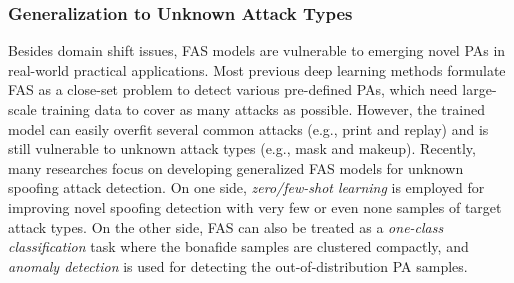 \documentclass[10pt,journal,compsoc]{IEEEtran}
\begin{document}







\subsubsection{Generalization to Unknown Attack Types}

Besides domain shift issues, FAS models are vulnerable to emerging novel PAs in real-world practical applications. Most previous deep learning methods formulate FAS as a close-set problem to detect various pre-defined PAs, which need large-scale training data to cover as many attacks as possible. However, the trained model can easily overfit several common attacks (e.g., print and replay) and is still vulnerable to unknown attack types (e.g., mask and makeup). Recently, many researches focus on developing generalized FAS models for unknown spoofing attack detection. On one side, \textit{zero/few-shot learning} is employed for improving novel spoofing detection with very few or even none samples of target attack types. On the other side, FAS can also be treated as a \textit{one-class classification} task where the bonafide samples are clustered compactly, and \textit{anomaly detection} is used for detecting the out-of-distribution PA samples.
\end{document}
